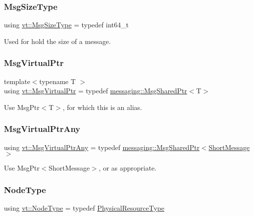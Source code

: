 \subsubsection{\texorpdfstring{Msg\+Size\+Type}{MsgSizeType}}
{\footnotesize\ttfamily using \hyperlink{namespacevt_a408e86a8c7c89309b52907dc5a513924}{vt\+::\+Msg\+Size\+Type} = typedef int64\+\_\+t}



Used for hold the size of a message. 

\mbox{\label{namespacevt_a82b5c92ea7ca3ddd2e8a2e27df87fa1a}} 
\subsubsection{\texorpdfstring{Msg\+Virtual\+Ptr}{MsgVirtualPtr}}
{\footnotesize\ttfamily template$<$typename T $>$ \\
using \hyperlink{namespacevt_a82b5c92ea7ca3ddd2e8a2e27df87fa1a}{vt\+::\+Msg\+Virtual\+Ptr} = typedef \hyperlink{structvt_1_1messaging_1_1_msg_shared_ptr}{messaging\+::\+Msg\+Shared\+Ptr}$<$T$>$}

Use {\ttfamily Msg\+Ptr$<$\+T$>$}, for which this is an alias. \mbox{\label{namespacevt_a54674b9f819f4f3a652c6f78d9b62aaf}} 
\subsubsection{\texorpdfstring{Msg\+Virtual\+Ptr\+Any}{MsgVirtualPtrAny}}
{\footnotesize\ttfamily using \hyperlink{namespacevt_a54674b9f819f4f3a652c6f78d9b62aaf}{vt\+::\+Msg\+Virtual\+Ptr\+Any} = typedef \hyperlink{structvt_1_1messaging_1_1_msg_shared_ptr}{messaging\+::\+Msg\+Shared\+Ptr}$<$\hyperlink{namespacevt_a1125ac1da6c0bbf141e0ea0739d7602d}{Short\+Message}$>$}

Use {\ttfamily Msg\+Ptr$<$\+Short\+Message$>$}, or as appropriate. \mbox{\label{namespacevt_a866da9d0efc19c0a1ce79e9e492f47e2}} 
\subsubsection{\texorpdfstring{Node\+Type}{NodeType}}
{\footnotesize\ttfamily using \hyperlink{namespacevt_a866da9d0efc19c0a1ce79e9e492f47e2}{vt\+::\+Node\+Type} = typedef \hyperlink{namespacevt_a2dc36fcada816dc6d11774d650328ee9}{Physical\+Resource\+Type}}



